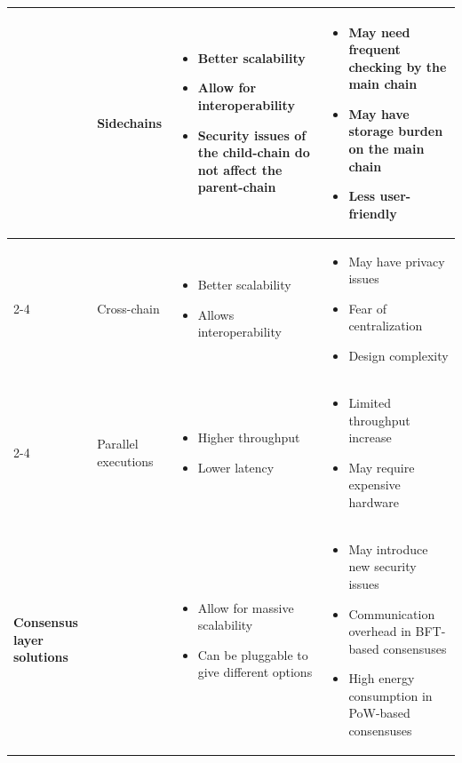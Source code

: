 \begin{table}[htbp]
{\begin{tabularx}{\textwidth}{@{}p{2.4cm} p{2.7cm} >{\raggedright\arraybackslash}X >{\raggedright\arraybackslash}X@{}}
& Sidechains &
\begin{itemize}
  \item Better scalability
  \item Allow for interoperability
  \item Security issues of the child-chain do not affect the parent-chain
\end{itemize} &
\begin{itemize}
  \item May need frequent checking by the main chain
  \item May have storage burden on the main chain
  \item Less user-friendly
\end{itemize} \\ \cmidrule(l){2-4}

& Cross-chain &
\begin{itemize}
  \item Better scalability
  \item Allows interoperability
\end{itemize} &
\begin{itemize}
  \item May have privacy issues
  \item Fear of centralization
  \item Design complexity
\end{itemize} \\ \cmidrule(l){2-4}

& Parallel executions &
\begin{itemize}
  \item Higher throughput
  \item Lower latency
\end{itemize} &
\begin{itemize}
  \item Limited throughput increase
  \item May require expensive hardware
\end{itemize} \\ 

\midrule

\multirow{1}{*}{\textbf{Consensus layer solutions}}
 &  &
\begin{itemize}
  \item Allow for massive scalability
  \item Can be pluggable to give different options
\end{itemize} &
\begin{itemize}
  \item May introduce new security issues
  \item Communication overhead in BFT-based consensuses
  \item High energy consumption in PoW-based consensuses
\end{itemize} \\
\midrule


\end{tabularx}}
\end{table}
